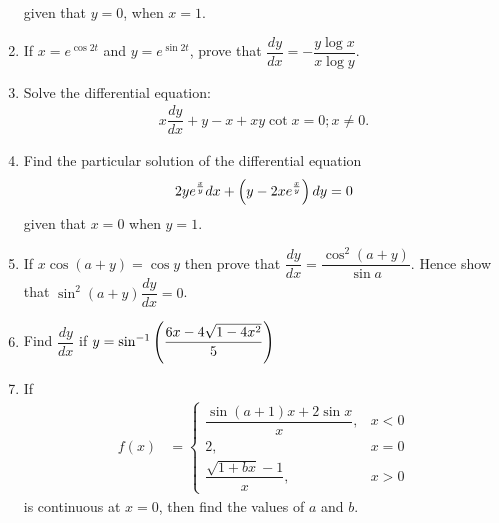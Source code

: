 \begin{enumerate}
          given that $y=0$, when $x=1$.
    \item If $x = e^{\cos{2t}}$ and $y = e^{\sin{2t}}$, prove that $ \dfrac{dy}{dx} = -\dfrac{y\log{x}}{x\log{y}}$.
    \item Solve the differential equation:
          \begin{align*}
              x\dfrac{dy}{dx} + y - x + xy\cot{x} = 0; x \neq 0.
          \end{align*}
    \item Find the particular solution of the differential equation
          \begin{align*}
              2ye^{\frac{x}{y}}dx + \left(y - 2xe^{\frac{x}{y}}\right)dy = 0
          \end{align*}
          given that $x=0$ when $y=1$.

    \item If $x\cos(a+y) = \cos{y}$ then prove that $\dfrac{dy}{dx} = \dfrac{\cos^2(a+y)}{\sin{a}}$. Hence show that $\sin^2(a+y)\dfrac{dy}{dx} = 0$.

    \item Find $\dfrac{dy}{dx}$ if $y = \sin^{-1}\left(\dfrac{6x - 4\sqrt{1-4x^2}}{5}\right)$

    \item If \begin{align*}
              f(x) &= \begin{cases}\dfrac{\sin(a+1)x + 2\sin x}{x}, &x<0\\ 2, &x=0 \\ \dfrac{\sqrt{1+bx}-1}{x}, &x>0 \end{cases}\end{align*} is continuous at $x=0$, then find the values of $a$ and $b$.


\end{enumerate}

